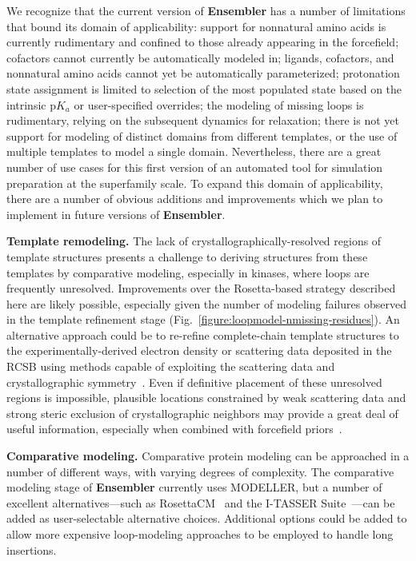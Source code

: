 \documentclass[aps,prl,preprint,nofootinbib,superscriptaddress,linenumbers]{revtex4-1}
\begin{document}
We recognize that the current version of {\bf Ensembler} has a number of limitations that bound its domain of applicability: support for nonnatural amino acids is currently rudimentary and confined to those already appearing in the forcefield; cofactors cannot currently be automatically modeled in; ligands, cofactors, and nonnatural amino acids cannot yet be automatically parameterized; protonation state assignment is limited to selection of the most populated state based on the intrinsic p$K_a$ or user-specified overrides; the modeling of missing loops is rudimentary, relying on the subsequent dynamics for relaxation; there is not yet support for modeling of distinct domains from different templates, or the use of multiple templates to model a single domain.
Nevertheless, there are a great number of use cases for this first version of an automated tool for simulation preparation at the superfamily scale.
To expand this domain of applicability, there are a number of obvious additions and improvements which we plan to implement in future versions of {\bf Ensembler}.

{\bf Template remodeling.}
The lack of crystallographically-resolved regions of template structures presents a challenge to deriving structures from these templates by comparative modeling, especially in kinases, where loops are frequently unresolved.
Improvements over the Rosetta-based strategy described here are likely possible, especially given the number of modeling failures observed in the template refinement stage (Fig.~\ref{figure:loopmodel-nmissing-residues}).
An alternative approach could be to re-refine complete-chain template structures to the experimentally-derived electron density or scattering data deposited in the RCSB using methods capable of exploiting the scattering data and crystallographic symmetry~\cite{schnieders:biophys-j:2010:x-ray-refinement}.
Even if definitive placement of these unresolved regions is impossible, plausible locations constrained by weak scattering data and strong steric exclusion of crystallographic neighbors may provide a great deal of useful information, especially when combined with forcefield priors~\cite{schnieders:jctc:2011:space-group-pme}.

{\bf Comparative modeling.}
Comparative protein modeling can be approached in a number of different ways, with varying degrees of complexity.
The comparative modeling stage of {\bf Ensembler} currently uses MODELLER, but a number of excellent alternatives---such as RosettaCM~\cite{baker:structure:2013:rosettacm} and the I-TASSER Suite~\cite{yang:nature-methods:2015:i-tasser-suite}---can be added as user-selectable alternative choices.
Additional options could be added to allow more expensive loop-modeling approaches to be employed to handle long insertions.
\end{document}
